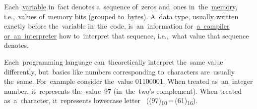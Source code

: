 \label{datatypes}
Each~\hyperref[variablefieldproperty]{variable} in~fact denotes a~sequence of~zeros and~ones in~the~\hyperref[systemmemory]{memory}, i.e.,~values of~memory \hyperref[bitsbytes]{bits} (grouped to~\hyperref[bitsbytes]{bytes}).
A~data type, usually written exactly before the~variable in~the~code, is~an~information for~\hyperref[compiledinterpretedlanguages]{a~compiler or~an~interpreter} how to~interpret that sequence, i.e.,~what value that sequence denotes.

Each~programming language can~theoretically interpret the~same value differently, but~basics like numbers corresponding to~characters are~usually the~same.
For~example consider the~value 01100001.
When treated as~an~integer number, it~represents the~value~97 (in~the~two's complement).
When treated as~a~character, it~represents lowercase letter~ \mbox{((97)\textsubscript{10}\,=\,(61)\textsubscript{16})}.

